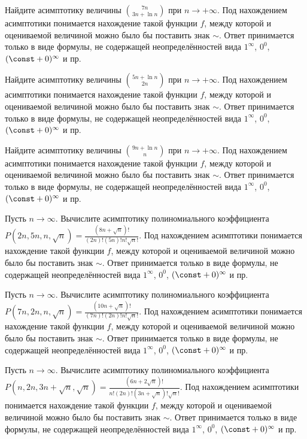 Найдите асимптотику величины $\binom{7n}{3n+\ln{n}}$ при $n\to+\infty$. Под нахождением асимптотики понимается нахождение такой функции $f$, между которой и оцениваемой величиной можно было бы поставить знак $\sim$. Ответ принимается только в виде формулы, не содержащей неопределённостей вида $1^{\infty}$, $0^0$, $(\const+0)^\infty$ и пр. %

Найдите асимптотику величины $\binom{5n+\ln{n}}{2n}$ при $n\to+\infty$. Под нахождением асимптотики понимается нахождение такой функции $f$, между которой и оцениваемой величиной можно было бы поставить знак $\sim$. Ответ принимается только в виде формулы, не содержащей неопределённостей вида $1^{\infty}$, $0^0$, $(\const+0)^\infty$ и пр.

Найдите асимптотику величины $\binom{9n+\ln{n}}{n}$ при $n\to+\infty$. Под нахождением асимптотики понимается нахождение такой функции $f$, между которой и оцениваемой величиной можно было бы поставить знак $\sim$. Ответ принимается только в виде формулы, не содержащей неопределённостей вида $1^{\infty}$, $0^0$, $(\const+0)^\infty$ и пр.

Пусть $n\to\infty$. Вычислите асимптотику полиномиального коэффициента $P(2n,5n,n,\sqrt{n})=\frac{(8n+\sqrt{n})!}{(2n)!(5n)!n!\sqrt{n}!}$.
Под нахождением асимптотики понимается нахождение такой функции $f$, между которой и оцениваемой величиной можно было бы поставить знак $\sim$. Ответ принимается только в виде формулы, не содержащей неопределённостей вида $1^{\infty}$, $0^0$, $(\const+0)^\infty$ и пр.

Пусть  $n\to\infty$. Вычислите асимптотику полиномиального коэффициента $P(7n,2n,n,\sqrt{n})=\frac{(10n+\sqrt{n})!}{(7n)!(2n)!n!\sqrt{n}!}$.
Под нахождением асимптотики понимается нахождение такой функции $f$, между которой и оцениваемой величиной можно было бы поставить знак $\sim$. Ответ принимается только в виде формулы, не содержащей неопределённостей вида $1^{\infty}$, $0^0$, $(\const+0)^\infty$ и пр.

Пусть $n\to\infty$. Вычислите асимптотику полиномиального коэффициента $P(n,2n,3n+\sqrt{n},\sqrt{n})=\frac{(6n+2\sqrt{n})!}{n!(2n)!(3n+\sqrt{n})!\sqrt{n}!}$.
Под нахождением асимптотики понимается нахождение такой функции $f$, между которой и оцениваемой величиной можно было бы поставить знак $\sim$. Ответ принимается только в виде формулы, не содержащей неопределённостей вида $1^{\infty}$, $0^0$, $(\const+0)^\infty$ и пр.

